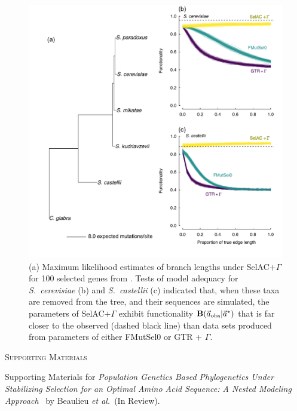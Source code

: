\documentclass[12pt,letterpaper,fleqn]{article}
\renewcommand{\section}[1]{%
\bigskip
\begin{center}
\begin{Large}
\normalfont\scshape #1
\medskip
\end{Large}
\end{center}}
\newcommand{\Funcaobsvec}{\ensuremath{\Func(\aobsvec|\aoptvec)}\xspace}
\newcommand{\Func}{\ensuremath{\text{\textbf{B}}}\xspace}
\newcommand{\selacplusgamma}{SelAC$+\Gamma$\xspace}
\newcommand{\aobsvec}{\ensuremath{\Vec{a}_{\text{obs}}}\xspace}
\newcommand{\aoptvec}{\ensuremath{\Vec{a}^*}\xspace}
\begin{document}
\begin{figure}[H]
  \centering
  \includegraphics[width=0.9\linewidth]{FIGURE_3_Inferred_Tree_AND_Model_Adequacy.pdf}
  \caption{(a) Maximum likelihood estimates of branch lengths under \selacplusgamma for 100 selected genes from \citet{SalichosAndRokas2013}.
    Tests of model adequacy for \emph{S.~cerevisiae} (b) and \emph{S.~castellii} (c) indicated that, when these taxa are removed from the tree, and their sequences are simulated, the parameters of \selacplusgamma exhibit functionality \Funcaobsvec that is far closer to the observed (dashed black line) than data sets produced from parameters of either FMutSel0 or GTR + $\Gamma$.
}
  \label{fig:TreeAndAdequacy}
\end{figure}


\clearpage

\setcounter{figure}{0}
\setcounter{table}{0}
\setcounter{page}{1}
\setcounter{section}{0}

\renewcommand{\thefigure}{S\arabic{figure}}
\renewcommand{\thetable}{S\arabic{table}}
\renewcommand{\thepage}{S\arabic{page}}
\renewcommand{\thesection}{\arabic{section}} %
\renewcommand{\appendixname}{Supporting Materials}
\renewcommand{\theequation}{S\arabic{equation}}

\setcounter{equation}{0}
\appendix



\section{Supporting Materials}
Supporting Materials for \emph{Population Genetics Based Phylogenetics Under Stabilizing Selection for an Optimal Amino Acid Sequence: A Nested Modeling Approach} \ by Beaulieu \emph{et al.}~(In Review).
\end{document}
